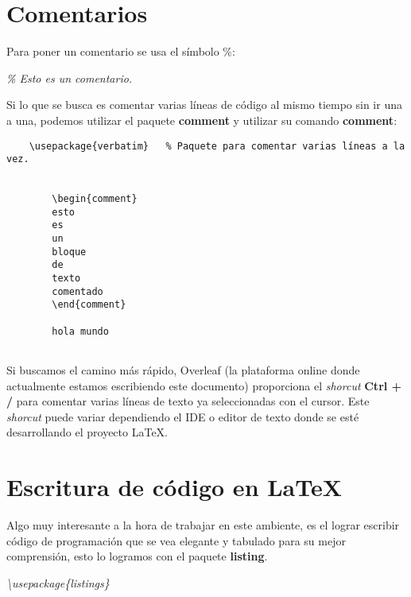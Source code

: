 \section{Comentarios}

Para poner un comentario se usa el símbolo \%:
\begin{center}
    \textit{\% Esto es un comentario.}
\end{center}

Si lo que se busca es comentar varias líneas de código al mismo tiempo sin ir una a una, podemos utilizar el paquete \textbf{comment} y utilizar su comando \textbf{comment}:
\begin{lstlisting}
    \usepackage{verbatim}   % Paquete para comentar varias líneas a la vez.
    
    
        \begin{comment}
        esto
        es
        un
        bloque
        de
        texto
        comentado
        \end{comment}
        
        hola mundo
    
\end{lstlisting}
\begin{comment}
    Hola mamá esto no se verá.
\end{comment}

Si buscamos el camino más rápido, Overleaf (la plataforma online donde actualmente estamos escribiendo este documento) proporciona el \textit{shorcut} \textbf{Ctrl + /} para comentar varias líneas de texto ya seleccionadas con el cursor. Este \textit{shorcut} puede variar dependiendo el IDE o editor de texto donde se esté desarrollando el proyecto \LaTeX.



\section{Escritura de código en \LaTeX}

Algo muy interesante a la hora de trabajar en este ambiente, es el lograr escribir código de programación que se vea elegante y tabulado para su mejor comprensión, esto lo logramos con el paquete \textbf{listing}.
\begin{center}
    \textit{\textbackslash{usepackage\{listings\}}}
\end{center}
    
